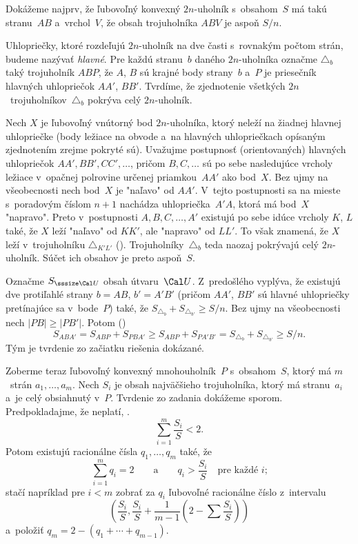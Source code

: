 {%
Dokážeme najprv, že ľubovoľný konvexný $2n$-uholník s~obsahom~$S$ má takú stranu~$AB$ a~vrchol~$V$, že obsah trojuholníka $ABV$ je aspoň $S/n$.

\smallskip
Uhlopriečky, ktoré rozdeľujú $2n$-uholník na dve časti s~rovnakým počtom strán, budeme nazývať {\it hlavné}. Pre každú stranu~$b$ daného $2n$-uholníka označme $\triangle_b$ taký trojuholník $ABP$, že $A$, $B$ sú krajné body strany~$b$ a~$P$ je priesečník hlavných uhlopriečok $AA'$, $BB'$. Tvrdíme, že zjednotenie všetkých $2n$~trojuholníkov~$\triangle_b$ pokrýva celý $2n$-uholník.

Nech $X$ je ľubovoľný vnútorný bod $2n$-uholníka, ktorý neleží na žiadnej hlavnej uhlopriečke (body ležiace na obvode a~na hlavných uhlopriečkach opísaným zjednotením zrejme pokryté sú). Uvažujme postupnosť (orientovaných) hlavných uhlopriečok $AA',BB',CC',\dots$, pričom $B,C,\dots$ sú po sebe nasledujúce vrcholy ležiace v~opačnej polrovine určenej priamkou~$AA'$ ako bod~$X$. Bez ujmy na všeobecnosti nech bod~$X$ je "naľavo" od $AA'$. V~tejto postupnosti sa na mieste s~poradovým číslom $n+1$ nachádza uhlopriečka~$A'A$, ktorá má bod~$X$ "napravo". Preto v~postupnosti $A,B,C,\dots,A'$ existujú po sebe idúce vrcholy $K$, $L$ také, že $X$ leží "naľavo" od $KK'$, ale "napravo" od $LL'$. To však znamená, že $X$ leží v~trojuholníku $\triangle_{K'L'}$ (\obr). Trojuholníky~$\triangle_b$ teda naozaj pokrývajú celý $2n$-uholník. Súčet ich obsahov je preto aspoň~$S$.

Označme $S_{\sssize\Cal U}$ obsah útvaru~$\Cal U$. Z~predošlého vyplýva, že existujú dve protiľahlé strany $b=AB$, $b'=A'B'$ (pričom $AA'$, $BB'$ sú hlavné uhlopriečky pretínajúce sa v~bode~$P$) také, že $S_{\triangle_b}+S_{\triangle_{b'}}\ge S/n$. Bez ujmy na všeobecnosti nech $|PB|\ge|PB'|$. Potom (\obr)
$$
S_{ABA'}=S_{ABP}+S_{PBA'}\ge S_{ABP}+S_{PA'B'}=S_{\triangle_b}+S_{\triangle_{b'}}\ge S/n.
$$
Tým je tvrdenie zo začiatku riešenia dokázané.

\smallskip
Zoberme teraz ľubovoľný konvexný mnohouholník~$P$ s~obsahom~$S$, ktorý má $m$~strán $a_1,\dots,a_m$. Nech $S_i$ je obsah najväčšieho trojuholníka, ktorý má stranu~$a_i$ a~je celý obsiahnutý v~$P$. Tvrdenie zo zadania dokážeme sporom. Predpokladajme, že neplatí, \tj.
$$
\sum_{i=1}^m\frac{S_i}S<2.
$$
Potom existujú racionálne čísla $q_1,\dots,q_m$ také, že
$$
\sum_{i=1}^m q_i=2\qquad\text{a}\qquad q_i>\frac{S_i}S\quad\text{pre každé $i$;}
$$
stačí napríklad pre $i<m$ zobrať za $q_i$ ľubovoľné racionálne číslo z~intervalu
$$
\left(\frac{S_i}S,\frac{S_i}S+\frac1{m-1}\left(2-\textstyle\sum\frac{S_i}S\right)\right)
$$
a~položiť $q_m=2-(q_1+\cdots+q_{m-1})$.

}
